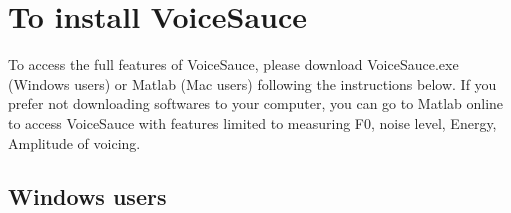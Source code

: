 \documentclass[
]{article}
\begin{document}
\hypertarget{to-install-voicesauce}{%
\section{To install VoiceSauce}\label{to-install-voicesauce}}

To access the full features of VoiceSauce, please download
VoiceSauce.exe (Windows users) or Matlab (Mac users) following the
instructions below. If you prefer not downloading softwares to your
computer, you can go to Matlab online to access VoiceSauce with features
limited to measuring F0, noise level, Energy, Amplitude of voicing.

\hypertarget{windows-users}{%
\subsection{Windows users}\label{windows-users}}
\end{document}
